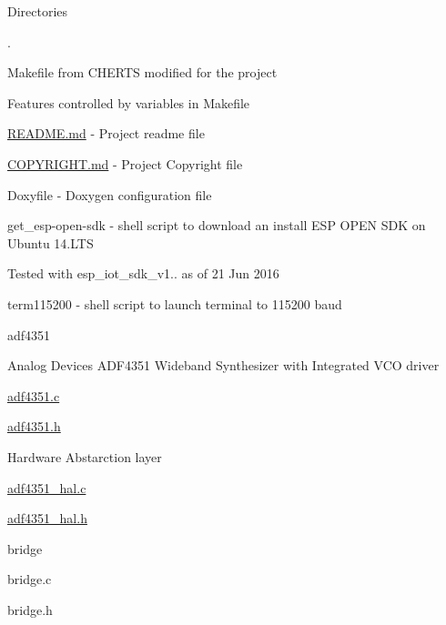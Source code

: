 \begin{DoxyParagraph}{Directories}

\begin{DoxyItemize}
\item .
\begin{DoxyItemize}
\item Makefile from C\+H\+E\+R\+TS modified for the project
\begin{DoxyItemize}
\item Features controlled by variables in Makefile
\end{DoxyItemize}
\item \hyperlink{README_8md}{R\+E\+A\+D\+M\+E.\+md} -\/ Project readme file
\item \hyperlink{COPYRIGHT_8md}{C\+O\+P\+Y\+R\+I\+G\+H\+T.\+md} -\/ Project Copyright file
\item Doxyfile -\/ Doxygen configuration file
\item get\+\_\+esp-\/open-\/sdk -\/ shell script to download an install E\+SP O\+P\+EN S\+DK on Ubuntu 14.\+L\+TS
\begin{DoxyItemize}
\item Tested with esp\+\_\+iot\+\_\+sdk\+\_\+v1.. as of 21 Jun 2016
\end{DoxyItemize}
\item term115200 -\/ shell script to launch terminal to 115200 baud
\end{DoxyItemize}
\item adf4351
\begin{DoxyItemize}
\item Analog Devices A\+D\+F4351 Wideband Synthesizer with Integrated V\+CO driver
\begin{DoxyItemize}
\item \hyperlink{adf4351_8c}{adf4351.\+c}
\item \hyperlink{adf4351_8h}{adf4351.\+h}
\end{DoxyItemize}
\item Hardware Abstarction layer
\item \hyperlink{adf4351__hal_8c}{adf4351\+\_\+hal.\+c}
\item \hyperlink{adf4351__hal_8h}{adf4351\+\_\+hal.\+h}
\end{DoxyItemize}
\item bridge
\begin{DoxyItemize}
\item bridge.\+c
\item bridge.\+h
\begin{DoxyItemize}

\end{DoxyItemize}
\end{DoxyItemize}
\end{DoxyItemize}
\end{DoxyParagraph}
